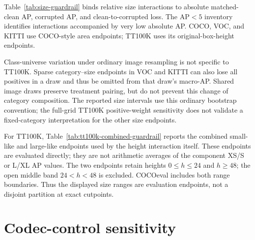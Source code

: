 \documentclass[10pt]{article}
\newcommand{\DeltaPsi}{\Delta\Psi}
\begin{document}
Table~\ref{tab:size-guardrail} binds relative size interactions to absolute
matched-clean AP, corrupted AP, and clean-to-corrupted loss. The AP$<5$
inventory identifies interactions accompanied by very low absolute AP. COCO, VOC, and KITTI use COCO-style area endpoints; TT100K uses
its original-box-height endpoints.

Class-universe variation under ordinary image resampling is not specific to
TT100K. Sparse category--size endpoints in VOC and KITTI can also lose all
positives in a draw and thus be omitted from that draw's macro-AP. Shared
image draws preserve treatment pairing, but do not prevent this change of
category composition. The reported size intervals use this ordinary
bootstrap convention; the full-grid TT100K positive-weight sensitivity does
not validate a fixed-category interpretation for the other size endpoints.

\begin{table}[htbp]
\centering
\caption{Size-specific absolute-accuracy guardrail. Values are balanced means
across 36 model--corruption--severity cells per row.}
\label{tab:size-guardrail}
\scriptsize
\resizebox{\textwidth}{!}{}
\end{table}

For TT100K, Table~\ref{tab:tt100k-combined-guardrail} reports the combined
small-like and large-like endpoints used by the height interaction itself.
These endpoints are evaluated directly; they are not arithmetic averages of
the component XS/S or L/XL AP values. The two endpoints retain heights
$0\leq h\leq24$ and $h\geq48$; the open middle band $24<h<48$ is excluded.
COCOeval includes both range boundaries. Thus the displayed size ranges are
evaluation endpoints, not a disjoint partition at exact cutpoints.

\begin{table}[htbp]
\centering
\caption{TT100K absolute-accuracy guardrail for the combined original-height
endpoints used in $\DeltaPsi$. $D$ is the signed clean-to-corrupted AP loss.}
\label{tab:tt100k-combined-guardrail}
\small
\resizebox{0.94\textwidth}{!}{}
\end{table}

\FloatBarrier

\section{Codec-control sensitivity}
\end{document}
